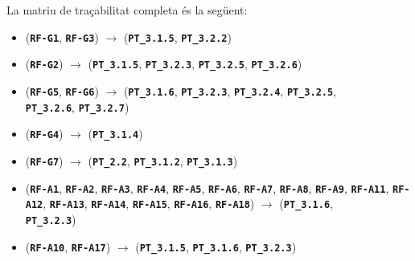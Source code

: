 \documentclass[a4paper,12pt]{ThesisStyle}
\begin{document}
La matriu de traçabilitat completa és la següent:
\begin{itemize}
  \item (\texttt{\textbf{RF-G1}}, \texttt{\textbf{RF-G3}}) \hspace{1pt} $\longrightarrow$ \hspace{1pt} (\texttt{\textbf{PT\_3.1.5}}, \texttt{\textbf{PT\_3.2.2}})
  \item (\texttt{\textbf{RF-G2}}) \hspace{1pt} $\longrightarrow$ \hspace{1pt} (\texttt{\textbf{PT\_3.1.5}}, \texttt{\textbf{PT\_3.2.3}}, \texttt{\textbf{PT\_3.2.5}}, \texttt{\textbf{PT\_3.2.6}})
  \item (\texttt{\textbf{RF-G5}}, \texttt{\textbf{RF-G6}}) \hspace{1pt} $\longrightarrow$ \hspace{1pt} (\texttt{\textbf{PT\_3.1.6}}, \texttt{\textbf{PT\_3.2.3}}, \texttt{\textbf{PT\_3.2.4}}, \texttt{\textbf{PT\_3.2.5}},\\
  \texttt{\textbf{PT\_3.2.6}}, \texttt{\textbf{PT\_3.2.7}})
  \item (\texttt{\textbf{RF-G4}}) \hspace{1pt} $\longrightarrow$ \hspace{1pt} (\texttt{\textbf{PT\_3.1.4}})
  \item (\texttt{\textbf{RF-G7}}) \hspace{1pt} $\longrightarrow$ \hspace{1pt} (\texttt{\textbf{PT\_2.2}}, \texttt{\textbf{PT\_3.1.2}}, \texttt{\textbf{PT\_3.1.3}})
  \item (\texttt{\textbf{RF-A1}}, \texttt{\textbf{RF-A2}}, \texttt{\textbf{RF-A3}}, \texttt{\textbf{RF-A4}}, \texttt{\textbf{RF-A5}}, \texttt{\textbf{RF-A6}}, \texttt{\textbf{RF-A7}}, \texttt{\textbf{RF-A8}}, \texttt{\textbf{RF-A9}}, \texttt{\textbf{RF-A11}}, \texttt{\textbf{RF-A12}}, \texttt{\textbf{RF-A13}}, \texttt{\textbf{RF-A14}}, \texttt{\textbf{RF-A15}}, \texttt{\textbf{RF-A16}}, \texttt{\textbf{RF-A18}}) \hspace{1pt} $\longrightarrow$ \hspace{1pt} (\texttt{\textbf{PT\_3.1.6}},\\
  \texttt{\textbf{PT\_3.2.3}})
  \item (\texttt{\textbf{RF-A10}}, \texttt{\textbf{RF-A17}}) \hspace{1pt} $\longrightarrow$ \hspace{1pt} (\texttt{\textbf{PT\_3.1.5}}, \texttt{\textbf{PT\_3.1.6}}, \texttt{\textbf{PT\_3.2.3}})

\end{itemize}
\end{document}
